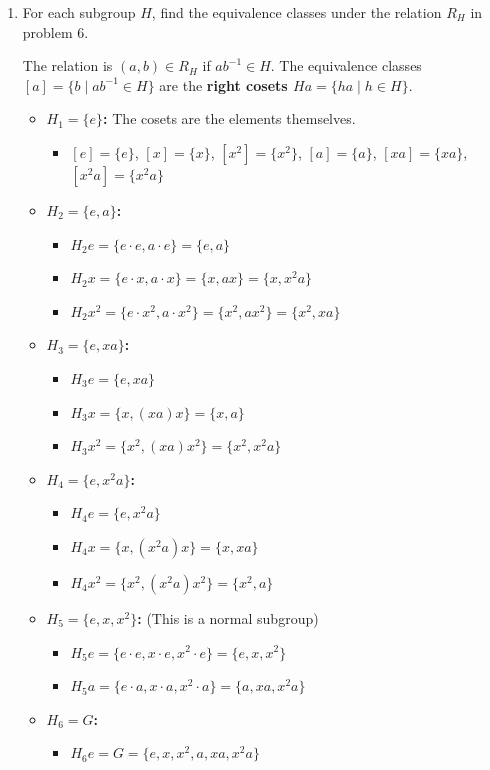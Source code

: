 \begin{enumerate}
\begin{enumerate}
    \item For each subgroup $H$, find the equivalence classes under the relation $R_H$ in problem 6.
    \begin{subanswer}
      The relation is $(a, b) \in R_H$ if $ab^{-1} \in H$. The equivalence classes $[a] = \{b \mid ab^{-1} \in H\}$ are the \textbf{right cosets $Ha = \{ha \mid h \in H\}$}.
      \begin{itemize}
        \item \textbf{$H_1 = \{e\}$:} The cosets are the elements themselves.
          \begin{itemize}
            \item $[e] = \{e\}$, $[x] = \{x\}$, $[x^2] = \{x^2\}$, $[a] = \{a\}$, $[xa] = \{xa\}$, $[x^2a] = \{x^2a\}$
          \end{itemize}
        \item \textbf{$H_2 = \{e, a\}$:}
          \begin{itemize}
            \item $H_2e = \{e \cdot e, a \cdot e\} = \{e, a\}$
            \item $H_2x = \{e \cdot x, a \cdot x\} = \{x, ax\} = \{x, x^2a\}$
            \item $H_2x^2 = \{e \cdot x^2, a \cdot x^2\} = \{x^2, ax^2\} = \{x^2, xa\}$
          \end{itemize}
        \item \textbf{$H_3 = \{e, xa\}$:}
          \begin{itemize}
            \item $H_3e = \{e, xa\}$
            \item $H_3x = \{x, (xa)x\} = \{x, a\}$
            \item $H_3x^2 = \{x^2, (xa)x^2\} = \{x^2, x^2a\}$
          \end{itemize}
        \item \textbf{$H_4 = \{e, x^2a\}$:}
          \begin{itemize}
            \item $H_4e = \{e, x^2a\}$
            \item $H_4x = \{x, (x^2a)x\} = \{x, xa\}$
            \item $H_4x^2 = \{x^2, (x^2a)x^2\} = \{x^2, a\}$
          \end{itemize}
        \item \textbf{$H_5 = \{e, x, x^2\}$:} (This is a normal subgroup)
          \begin{itemize}
            \item $H_5e = \{e \cdot e, x \cdot e, x^2 \cdot e\} = \{e, x, x^2\}$
            \item $H_5a = \{e \cdot a, x \cdot a, x^2 \cdot a\} = \{a, xa, x^2a\}$
          \end{itemize}
        \item \textbf{$H_6 = G$:}
          \begin{itemize}
            \item $H_6e = G = \{e, x, x^2, a, xa, x^2a\}$
          \end{itemize}
      \end{itemize}
    \end{subanswer}


\end{enumerate}
\end{enumerate}
